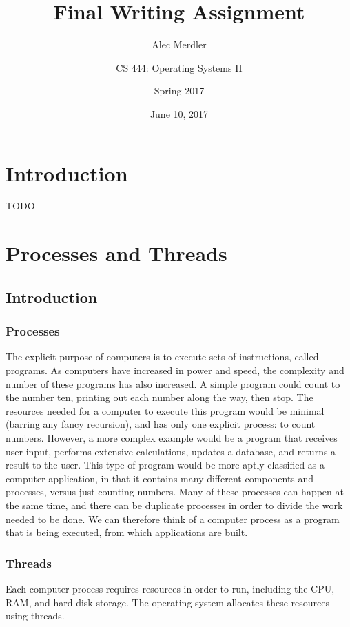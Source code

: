 \documentclass[letterpaper,draftclsnofoot,10pt,onecolumn,titlepage]{IEEEtran}\usepackage[margin=0.75in]{geometry}
\title{Final Writing Assignment}
\author{
	Alec Merdler\\
	\and
	CS 444: Operating Systems II\\
	\and
	Spring 2017\\
}
\date{June 10, 2017}
\begin{document}
\begin{titlepage}
\clearpage\maketitle
\thispagestyle{empty}

\maketitle
\end{titlepage}

\section{Introduction}
TODO


\section{Processes and Threads}
    \subsection{Introduction}
        \subsubsection{Processes}
        The explicit purpose of computers is to execute sets of instructions, called programs. As computers have increased
        in power and speed, the complexity and number of these programs has also increased. A simple program could count
        to the number ten, printing out each number along the way, then stop. The resources needed for a computer to
        execute this program would be minimal (barring any fancy recursion), and has only one explicit process: to
        count numbers. However, a more complex example would be a program that receives user input, performs extensive
        calculations, updates a database, and returns a result to the user. This type of program would be more aptly
        classified as a computer application, in that it contains many different components and processes, versus just
        counting numbers. Many of these processes can happen at the same time, and there can be duplicate processes in
        order to divide the work needed to be done. We can therefore think of a computer process as a program that is
        being executed, from which applications are built.

        \subsubsection{Threads}
        Each computer process requires resources in order to run, including the CPU, RAM, and hard disk storage. The
        operating system allocates these resources using threads.
\end{document}
